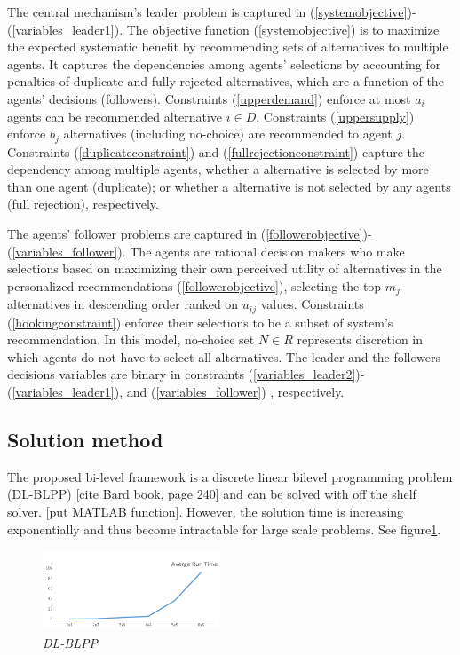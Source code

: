 \documentclass[11pt, letterpaper]{article}
\begin{document}
The central mechanism's leader problem is captured in (\ref{systemobjective})-(\ref{variables_leader1}).
The objective function (\ref{systemobjective}) is to maximize the expected systematic benefit by recommending sets of alternatives to multiple agents.  It captures the dependencies among agents' selections by accounting for penalties of duplicate and fully rejected alternatives, which are a function of the agents' decisions (followers).  
Constraints (\ref{upperdemand}) enforce at most $a_i$ agents can be recommended alternative $i \in D$.  Constraints (\ref{uppersupply}) enforce $b_j$  alternatives (including no-choice) are recommended to agent $j$.  Constraints  (\ref{duplicateconstraint}) and (\ref{fullrejectionconstraint}) capture the dependency among multiple agents, whether a alternative is selected by more than one agent (duplicate); or whether a alternative is not selected by any agents (full rejection), respectively.   


The agents' follower problems are captured in (\ref{followerobjective})-(\ref{variables_follower}). The agents are rational decision makers who make selections based on maximizing their own perceived utility of alternatives in the personalized recommendations (\ref{followerobjective}), selecting the top $m_j$ alternatives in descending order ranked on $u_{ij}$ values. Constraints (\ref{hookingconstraint}) enforce their selections to be a subset of system's recommendation. 
In this model, no-choice set $N \in R$ represents discretion in which agents do not have to select all alternatives.   
The leader and the followers decisions variables are binary in constraints (\ref{variables_leader2})-(\ref{variables_leader1}), and (\ref{variables_follower}) , respectively. 

\subsection{Solution method}
The proposed bi-level framework is a discrete linear bilevel programming problem (DL-BLPP) [cite Bard book, page 240] and can be solved with off the shelf solver. [put MATLAB function]. However, the solution time is increasing exponentially and thus become intractable for large scale problems. See figure\ref{fig:runtime1}.
\begin{figure}
	\centering
	\includegraphics[width=0.47\textwidth]{runtime_pic.png}
	\caption{\emph{DL-BLPP}}   \label{fig:runtime1}
\end{figure}  
\noindent
\end{document}
